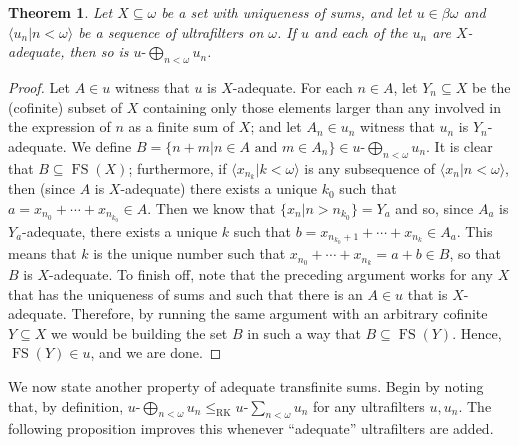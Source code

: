 \documentclass[10pt]{amsart}
\newcommand{\usum}[2]{#1\text{-}\sum_{#2<\omega}}
\newcommand{\uadd}[2]{#1\text{-}\bigoplus_{#2<\omega}}
\DeclareMathOperator{\fs}{FS}
\newcommand{\leqrk}[2]{#1\leq_{\mathrm{RK}}#2}
\newtheorem{theorem}{Theorem}[section]
\theoremstyle{definition}
\theoremstyle{remark}
\begin{document}
\begin{theorem}\label{thm:preserve-goodness}
    Let $X\subseteq\omega$ be a set with uniqueness of sums, and let $u\in\beta\omega$ and $\langle u_n\big|n<\omega\rangle$ be a sequence of ultrafilters on $\omega$. If $u$ and each of the $u_n$ are $X$-adequate, then so is $\uadd{u}{n}u_n$.
\end{theorem}

\begin{proof}
    Let $A\in u$ witness that $u$ is $X$-adequate. For each $n\in A$, let $Y_n\subseteq X$ be the (cofinite) subset of $X$ containing only those elements larger than any involved in the expression of $n$ as a finite sum of $X$; and let $A_n\in u_n$ witness that $u_n$ is $Y_n$-adequate. We define $B=\{n+m\big|n\in A\text{ and }m\in A_n\}\in\uadd{u}{n}u_n$. It is clear that $B\subseteq\fs(X)$; furthermore, if $\langle x_{n_k}\big|k<\omega\rangle$ is any subsequence of $\langle x_n\big|n<\omega\rangle$, then (since $A$ is $X$-adequate) there exists a unique $k_0$ such that $a=x_{n_0}+\cdots+x_{n_{k_0}}\in A$. Then we know that $\{ x_n\big|n>n_{k_0}\}=Y_a$ and so, since $A_a$ is $Y_a$-adequate, there exists a unique $k$ such that $b=x_{n_{k_0}+1}+\cdots+x_{n_k}\in A_a$. This means that $k$ is the unique number such that $x_{n_0}+\cdots+x_{n_k}=a+b\in B$, so that $B$ is $X$-adequate.
    To finish off, note that the preceding argument works for any $X$ that has the uniqueness of sums and such that there is an $A\in u$ that is $X$-adequate. Therefore, by running the same argument with an arbitrary cofinite $Y\subseteq X$ we would be building the set $B$ in such a way that $B\subseteq\fs(Y)$. Hence, $\fs(Y)\in u$, and we are done. 
\end{proof}

We now state another property of adequate transfinite sums. Begin by noting that, by definition, $\leqrk{\uadd{u}{n}u_n}{\usum{u}{n}u_n}$ for any ultrafilters $u,u_n$. The following proposition improves this whenever ``adequate'' ultrafilters are added.
\end{document}
